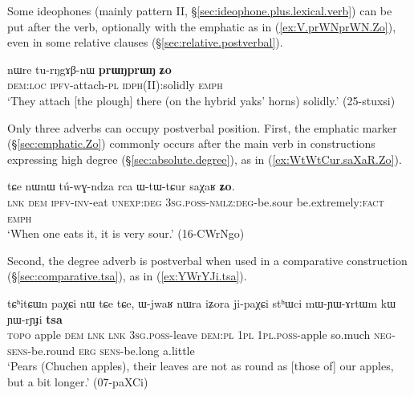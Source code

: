 Some ideophones (mainly pattern II, §\ref{sec:ideophone.plus.lexical.verb}) can be put after the verb, optionally with the emphatic  as in (\ref{ex:V.prWNprWN.Zo}), even in some relative clauses (§\ref{sec:relative.postverbal}).

\begin{exe}
\ex \label{ex:V.prWNprWN.Zo}
\gll nɯre tu-rŋgɤβ-nɯ \textbf{prɯŋprɯŋ} \textbf{ʑo} \\
\textsc{dem}:\textsc{loc} \textsc{ipfv}-attach-\textsc{pl} \textsc{idph}(II):solidly \textsc{emph} \\
\glt `They attach [the plough] there (on the hybrid yaks' horns) solidly.' (25-stuxsi)
\end{exe}

Only three adverbs can occupy postverbal position. First, the emphatic marker  (§\ref{sec:emphatic.Zo}) commonly occurs after the main verb in constructions expressing high degree (§\ref{sec:absolute.degree}), as in (\ref{ex:WtWtCur.saXaR.Zo}).

\begin{exe}
\ex \label{ex:WtWtCur.saXaR.Zo}
\gll  tɕe nɯnɯ tú-wɣ-ndza rca ɯ-tɯ-tɕur saχaʁ \textbf{ʑo}. \\
\textsc{lnk} \textsc{dem} \textsc{ipfv}-\textsc{inv}-eat \textsc{unexp}:\textsc{deg} \textsc{3sg}.\textsc{poss}-\textsc{nmlz}:\textsc{deg}-be.sour be.extremely:\textsc{fact} \textsc{emph} \\
\glt `When one eats it, it is very sour.' (16-CWrNgo)
\end{exe}

Second, the degree adverb  is postverbal when used in a comparative construction (§\ref{sec:comparative.tsa}), as in (\ref{ex:YWrYJi.tsa}).

\begin{exe}
\ex \label{ex:YWrYJi.tsa}
\gll tɕʰitɕɯn paχɕi nɯ tɕe tɕe, ɯ-jwaʁ nɯra iʑora ji-paχɕi stʰɯci mɯ-ɲɯ-ɤrtɯm kɯ ɲɯ-rɲɟi \textbf{tsa} \\
\textsc{topo} apple \textsc{dem} \textsc{lnk} \textsc{lnk} \textsc{3sg}.\textsc{poss}-leave \textsc{dem}:\textsc{pl} \textsc{1pl} \textsc{1pl}.\textsc{poss}-apple so.much \textsc{neg}-\textsc{sens}-be.round \textsc{erg} \textsc{sens}-be.long a.little \\
\glt `Pears (Chuchen apples), their leaves are not as round as [those of] our apples, but a bit longer.' (07-paXCi)
\end{exe}

